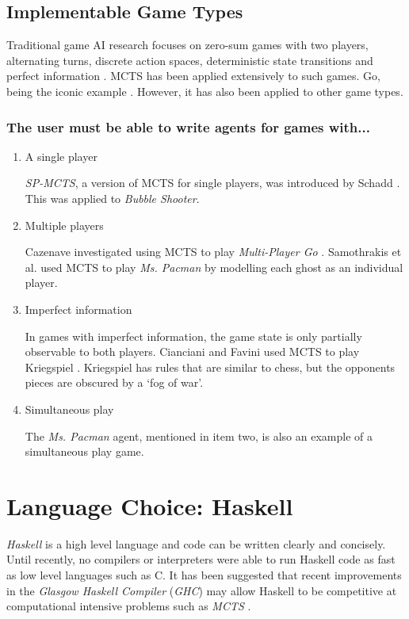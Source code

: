 \subsection{Implementable Game Types}
Traditional game AI research focuses on zero-sum games with two players, alternating turns, discrete action spaces, deterministic state transitions and perfect information \cite{survey}. {MCTS} has been applied extensively to such games. {Go}, being the iconic example \cite{go}. However, it has also been applied to other game types.
\subsubsection{The user must be able to write agents for games with...}
\begin{enumerate}
\item A single player
\par \textit{SP-MCTS}, a version of {MCTS} for single players, was introduced by Schadd \cite{schadd11,schadd11t}. This was applied to \textit{Bubble Shooter}.
\item Multiple players
\par Cazenave investigated using {MCTS} to play \textit{Multi-Player Go} \cite{cazenave08}. Samothrakis et al. \cite{pacman} used {MCTS} to play \textit{Ms. Pacman} by modelling each ghost as an individual player.
\item Imperfect information
\par In games with imperfect information, the game state is only partially observable to both players. Cianciani and Favini used {MCTS} to play {Kriegspiel} \cite{kriegspiel}. {Kriegspiel} has rules that are similar to chess, but the opponents pieces are obscured by a `fog of war'.
\item Simultaneous play
\par The \textit{Ms. Pacman} agent, mentioned in item two, is also an example of a simultaneous play game.
\end{enumerate}


\section{Language Choice: Haskell\label{sec:prephs}}
\textit{Haskell} is a high level language and code can be written clearly and concisely. Until recently, no compilers or interpreters were able to run Haskell code as fast as low level languages such as C. It has been suggested that recent improvements in the \textit{Glasgow Haskell Compiler} (\textit{GHC}) may allow Haskell to be competitive at computational intensive problems such as \textit{MCTS} \cite{holden}.


